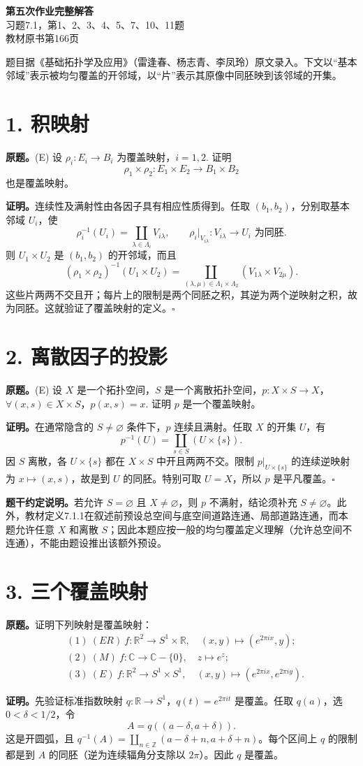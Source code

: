 \documentclass[UTF8,11pt,a4paper]{ctexart}
\newcommand{\R}{\mathbb R}\newcommand{\Z}{\mathbb Z}\newcommand{\C}{\mathbb C}
\newcommand{\pf}{\par\noindent\textbf{证明。}}
\begin{document}
\begin{center}{\LARGE\bfseries 第五次作业完整解答}\\[6pt]习题7.1，第1、2、3、4、5、7、10、11题\\[4pt]教材原书第166页\end{center}
\noindent 题目据《基础拓扑学及应用》（雷逢春、杨志青、李凤玲）原文录入。下文以“基本邻域”表示被均匀覆盖的开邻域，以“片”表示其原像中同胚映到该邻域的开集。

\section*{1. 积映射}
\textbf{原题。}(E) 设 $\rho_i:E_i\to B_i$ 为覆盖映射，$i=1,2$. 证明
\[\rho_1\times\rho_2:E_1\times E_2\to B_1\times B_2\]
也是覆盖映射。
\pf 连续性及满射性由各因子具有相应性质得到。任取 $(b_1,b_2)$，分别取基本邻域 $U_i$，使
\[\rho_i^{-1}(U_i)=\coprod_{\lambda\in\Lambda_i}V_{i\lambda},\qquad
\rho_i|_{V_{i\lambda}}:V_{i\lambda}\longrightarrow U_i\text{ 为同胚}.\]
则 $U_1\times U_2$ 是 $(b_1,b_2)$ 的开邻域，而且
\[(\rho_1\times\rho_2)^{-1}(U_1\times U_2)
=\coprod_{(\lambda,\mu)\in\Lambda_1\times\Lambda_2}(V_{1\lambda}\times V_{2\mu}).\]
这些片两两不交且开；每片上的限制是两个同胚之积，其逆为两个逆映射之积，故为同胚。这就验证了覆盖映射的定义。\hfill$\square$

\section*{2. 离散因子的投影}
\textbf{原题。}(E) 设 $X$ 是一个拓扑空间，$S$ 是一个离散拓扑空间，$p:X\times S\to X$，$\forall(x,s)\in X\times S$，$p(x,s)=x$. 证明 $p$ 是一个覆盖映射。
\pf 在通常隐含的 $S\ne\varnothing$ 条件下，$p$ 连续且满射。任取 $X$ 的开集 $U$，有
\[p^{-1}(U)=\coprod_{s\in S}(U\times\{s\}).\]
因 $S$ 离散，各 $U\times\{s\}$ 都在 $X\times S$ 中开且两两不交。限制 $p|_{U\times\{s\}}$ 的连续逆映射为 $x\mapsto(x,s)$，故是到 $U$ 的同胚。特别可取 $U=X$，所以 $p$ 是平凡覆盖。\hfill$\square$

\textbf{题干约定说明。}若允许 $S=\varnothing$ 且 $X\ne\varnothing$，则 $p$ 不满射，结论须补充 $S\ne\varnothing$。此外，教材定义7.1.1在叙述前预设总空间与底空间道路连通、局部道路连通，而本题允许任意 $X$ 和离散 $S$；因此本题应按一般的均匀覆盖定义理解（允许总空间不连通），不能由题设推出该额外预设。

\section*{3. 三个覆盖映射}
\textbf{原题。}证明下列映射是覆盖映射：
\begin{align*}
&(1)\ (ER)\ f:\R^2\to S^1\times\R,\quad (x,y)\mapsto(e^{2\pi ix},y);\\
&(2)\ (M)\ f:\C\to\C-\{0\},\quad z\mapsto e^z;\\
&(3)\ (E)\ f:\R^2\to S^1\times S^1,\quad (x,y)\mapsto(e^{2\pi ix},e^{2\pi iy}).
\end{align*}
\pf 先验证标准指数映射 $q:\R\to S^1$，$q(t)=e^{2\pi it}$ 是覆盖。任取 $q(a)$，选 $0<\delta<1/2$，令
\[A=q((a-\delta,a+\delta)).\]
这是开圆弧，且 $q^{-1}(A)=\coprod_{n\in\Z}(a-\delta+n,a+\delta+n)$。每个区间上 $q$ 的限制都是到 $A$ 的同胚（逆为连续辐角分支除以 $2\pi$）。因此 $q$ 是覆盖。
\end{document}

